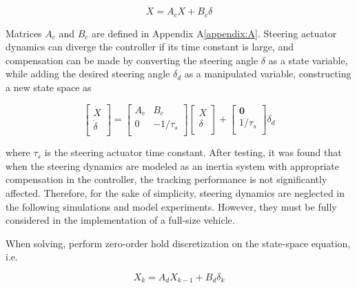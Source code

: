 \vspace{-0.3cm}
\begin{equation}
\dot{X} = A_c X + B_c \delta
\label{eq:c_time_ss_model}
\end{equation}
\vspace{-0.3cm}

Matrices $A_c$ and $B_c$ are defined in Appendix A\ref{appendix:A}. Steering actuator dynamics can diverge the controller if its time constant is large, and compensation can be made by converting the steering angle $\delta$ as a state variable, while adding the desired steering angle $\delta_{d}$ as a manipulated variable, constructing a new state space as

\vspace{-0.3cm}
\begin{equation}
\begin{bmatrix} \dot{X} \\\dot{\delta}  \\\end{bmatrix} = \begin{bmatrix} 
  A_c & B_c\\
  0   & -1/\tau_{s} \\
\end{bmatrix}\begin{bmatrix} X \\\delta  \\\end{bmatrix}
+\begin{bmatrix} \textbf{0} \\1/\tau_{s}  \\\end{bmatrix}\delta_{d}
\label{eq:steerActuator_ss_model}
\end{equation}
\vspace{-0.3cm}

where $\tau_s$ is the steering actuator time constant. After testing, it was found that when the steering dynamics are modeled as an inertia system with appropriate compensation in the controller, the tracking performance is not significantly affected. Therefore, for the sake of simplicity, steering dynamics are neglected in the following simulations and model experiments. However, they must be fully considered in the implementation of a full-size vehicle.

When solving, perform zero-order hold discretization on the state-space equation, i.e.

\vspace{-0.3cm}
\begin{equation}
X_k = A_d X_{k-1} + B_d \delta_k
\end{equation}

